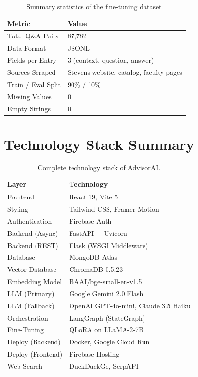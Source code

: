 \documentclass[conference,compsoc]{IEEEtran}
\begin{document}
\begin{table}[htbp]
\centering
\caption{Summary statistics of the fine-tuning dataset.}
\label{tab:dataset_stats}
\begin{tabularx}{\columnwidth}{L{3.5cm}X}
\toprule
\textbf{Metric} & \textbf{Value} \\
\midrule
Total Q\&A Pairs & 87,782 \\
Data Format & JSONL \\
Fields per Entry & 3 (context, question, answer) \\
Sources Scraped & Stevens website, catalog, faculty pages \\
Train / Eval Split & 90\% / 10\% \\
Missing Values & 0 \\
Empty Strings & 0 \\
\bottomrule
\end{tabularx}
\end{table}

\section{Technology Stack Summary}

\begin{table}[htbp]
\centering
\caption{Complete technology stack of AdvisorAI.}
\label{tab:tech_stack}
\small
\begin{tabularx}{\columnwidth}{L{2.5cm}X}
\toprule
\textbf{Layer} & \textbf{Technology} \\
\midrule
Frontend & React 19, Vite 5 \\
Styling & Tailwind CSS, Framer Motion \\
Authentication & Firebase Auth \\
Backend (Async) & FastAPI + Uvicorn \\
Backend (REST) & Flask (WSGI Middleware) \\
Database & MongoDB Atlas \\
Vector Database & ChromaDB 0.5.23 \\
Embedding Model & BAAI/bge-small-en-v1.5 \\
LLM (Primary) & Google Gemini 2.0 Flash \\
LLM (Fallback) & OpenAI GPT-4o-mini, Claude 3.5 Haiku \\
Orchestration & LangGraph (StateGraph) \\
Fine-Tuning & QLoRA on LLaMA-2-7B \\
Deploy (Backend) & Docker, Google Cloud Run \\
Deploy (Frontend) & Firebase Hosting \\
Web Search & DuckDuckGo, SerpAPI \\
\bottomrule
\end{tabularx}
\end{table}
\end{document}
